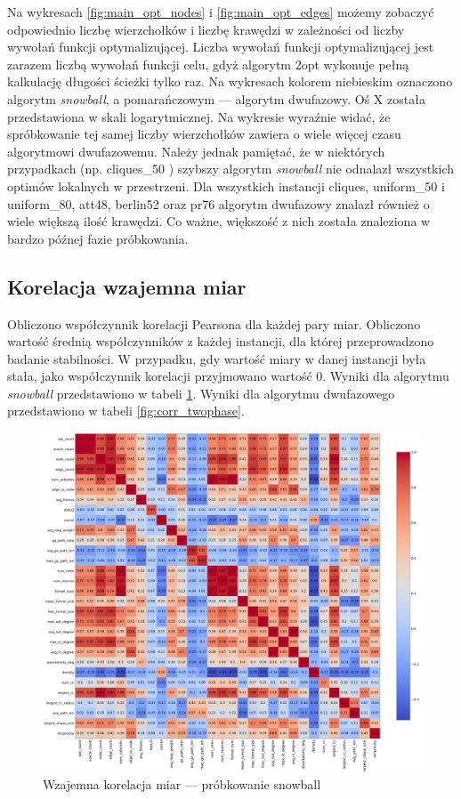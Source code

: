 Na wykresach \ref{fig:main_opt_nodes} i \ref{fig:main_opt_edges} możemy zobaczyć odpowiednio liczbę wierzchołków i liczbę krawędzi
w zależności od liczby wywołań funkcji optymalizującej. Liczba wywołań funkcji optymalizującej jest zarazem liczbą wywołań funkcji celu, gdyż
algorytm 2opt wykonuje pełną kalkulację długości ścieżki tylko raz.
Na wykresach kolorem niebieskim oznaczono algorytm \textit{snowball}, a pomarańczowym --- algorytm dwufazowy.
Oś X została przedstawiona w skali logarytmicznej.
Na wykresie wyraźnie widać, że spróbkowanie tej samej liczby wierzchołków zawiera o wiele więcej czasu algorytmowi dwufazowemu.
Należy jednak pamiętać, że w niektórych przypadkach (np. cliques\_50 ) szybszy algorytm \textit{snowball} nie odnalazł wszystkich optimów lokalnych w przestrzeni.
Dla wszystkich instancji cliques, uniform\_50 i uniform\_80, att48, berlin52 oraz pr76 algorytm dwufazowy znalazł również o wiele większą ilość krawędzi.
Co ważne, większość z nich została znaleziona w bardzo późnej fazie próbkowania.

\subsection{Korelacja wzajemna miar}
Obliczono współczynnik korelacji Pearsona dla każdej pary miar.
Obliczono wartość średnią współczynników z każdej instancji, dla której przeprowadzono badanie stabilności.
W przypadku, gdy wartość miary w danej instancji była stała, jako współczynnik korelacji przyjmowano wartość 0.
Wyniki dla algorytmu \textit{snowball} przedstawiono w tabeli \ref{fig:corr_snowball}.
Wyniki dla algorytmu dwufazowego przedstawiono w tabeli \ref{fig:corr_twophase}.
\begin{figure}[h!]
    \centering
    \includegraphics[width=\textwidth]{chapters/experiments/img/snowball_corr.png}
    \caption{Wzajemna korelacja miar --- próbkowanie snowball}
    \label{fig:corr_snowball}
\end{figure}

